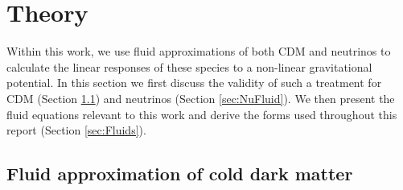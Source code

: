 \documentclass{aastex}
\begin{document}



\section{Theory}
\label{sec:Theory}

Within this work, we use fluid approximations of both CDM 
and neutrinos to calculate the linear responses of these species
to a non-linear gravitational potential.  
In this section we first discuss the validity of such a
treatment for CDM (Section \ref{sec:CDMFluid}) and
neutrinos (Section \ref{sec:NuFluid}).  We then present the fluid
equations relevant to this work and derive the forms used throughout
this report (Section \ref{sec:Fluids}).

\subsection{ Fluid approximation of cold dark matter }
\label{sec:CDMFluid}
\end{document}
